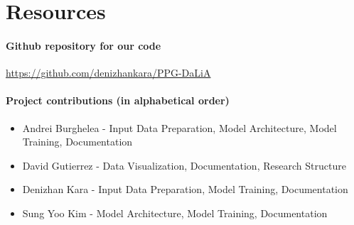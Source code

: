 \documentclass[12pt, conference]{IEEEtran}
\begin{document}
\section*{Resources}

\paragraph*{Github repository for our code} \small{\url{https://github.com/denizhankara/PPG-DaLiA}}\\

\paragraph*{Project contributions (in alphabetical order)}

\begin{itemize}
\item Andrei Burghelea - Input Data Preparation, Model Architecture, Model Training, Documentation
\item David Gutierrez - Data Visualization, Documentation, Research Structure
\item Denizhan Kara - Input Data Preparation, Model Training, Documentation
\item Sung Yoo Kim - Model Architecture, Model Training, Documentation
\end{itemize}




%





\end{document}

